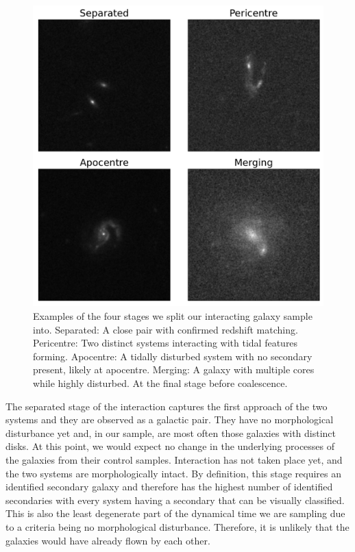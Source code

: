 \begin{figure}
    \centering
    \includegraphics[width=\textwidth]{Chapter3/figures/examples-stages.pdf}
    \caption[Examples of the four stages we split our interacting galaxy sample into.]{Examples of the four stages we split our interacting galaxy sample into. Separated: A close pair with confirmed redshift matching. Pericentre: Two distinct systems interacting with tidal features forming. Apocentre: A tidally disturbed system with no secondary present, likely at apocentre. Merging: A galaxy with multiple cores while highly disturbed. At the final stage before coalescence.}
    \label{fig:stages}
\end{figure}

The separated stage of the interaction captures the first approach of the two systems and they are observed as a galactic pair. They have no morphological disturbance yet and, in our sample, are most often those galaxies with distinct disks. At this point, we would expect no change in the underlying processes of the galaxies from their control samples. Interaction has not taken place yet, and the two systems are morphologically intact. By definition, this stage requires an identified secondary galaxy and therefore has the highest number of identified secondaries with every system having a secondary that can be visually classified. This is also the least degenerate part of the dynamical time we are sampling due to a criteria being no morphological disturbance. Therefore, it is unlikely that the galaxies would have already flown by each other.

